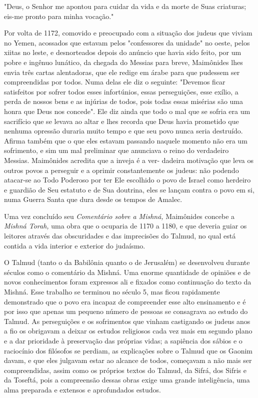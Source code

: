 "Deus, o Senhor me apontou para cuidar da vida e da morte de Suas
criaturas; eis-me pronto para minha vocação."

Por volta de 1172, comovido e preocupado com a situação dos ju­deus que
viviam no Yemen, acossados que estavam pelos "confessores da uni­dade"
no oeste, pelos xiitas no leste, e desnorteados depois do anúncio que
havia sido feito, por um pobre e ingênuo lunático, da chegada do Messias
para breve, Maimônides lhes envia três cartas alentadoras, que ele
redige em árabe para que pudessem ser compreendidas por todos. Numa
delas ele diz o seguin­te: "Devemos ficar satisfeitos por sofrer todos
esses infortúnios, essas perse­guições, esse exílio, a perda de nossos
bens e as injúrias de todos, pois todas essas misérias são uma honra que
Deus nos concede". Ele diz ainda que todo o mal que se sofria era um
sacrifício que se levava ao altar e lhes recorda que Deus havia
prometido que nenhuma opressão duraria muito tempo e que seu povo nunca
seria destruído. Afirma também que o que eles estavam passando naquele
momento não era um sofrimento, e sim um mal preliminar que anun­ciava o
reino do verdadeiro Messias. Maimônides acredita que a inveja é a ver-
dadeira motivação que leva os outros povos a perseguir e a oprimir
constante­mente os judeus: não podendo atacar-se ao Todo Poderoso por
ter Ele escolhi­do o povo de Israel como herdeiro e guardião de Seu
estatuto e de Sua doutri­na, eles se lançam contra o povo em si, numa
Guerra Santa que dura desde os tempos de Amalec.

Uma vez concluído seu \emph{Comentário sobre a Mishná,} Maimônides
concebe a \emph{Mishná Torah,} uma obra que o ocuparia de 1170 a 1180, e
que de­veria guiar os leitores através das obscuridades e das
imprecisões do Talmud, no qual está contida a vida interior e exterior
do judaísmo.

O Talmud (tanto o da Babilônia quanto o de Jerusalém) se desenvol­veu
durante séculos como o comentário da Mishná. Uma enorme quantidade de
opiniões e de novos conhecimentos foram expressos ali e fixados como
con­tinuação do texto da Mishná. Esse trabalho se terminou no século 5,
mas ficou rapidamente demonstrado que o povo era incapaz de compreender
esse alto ensinamento e é por isso que apenas um pequeno número de
pessoas se consa­grava ao estudo do Talmud. As perseguições e os
sofrimentos que vinham cas­tigando os judeus anos a fio os obrigavam a
deixar os estudos religiosos cada vez mais em segundo plano e a dar
prioridade à preservação das próprias vidas; a sapiência dos sábios e o
raciocínio dos filósofos se perdiam, as explicações sobre o Talmud que
os Gaonim davam, e que eles julgavam estar ao alcance de todos,
começavam a não mais ser compreendidas, assim como os próprios textos do
Talmud, da Sifrá, dos Sifris e da Toseftá, pois a compreensão dessas
obras exige uma grande inteligência, uma alma preparada e extensos e
aprofun­dados estudos.

